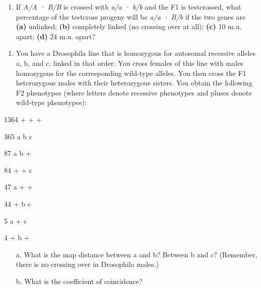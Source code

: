 \documentclass[11pt,]{article}
\providecommand{\tightlist}{%
  \setlength{\itemsep}{0pt}\setlength{\parskip}{0pt}}
\begin{document}
\begin{blackbox}

\begin{enumerate}
\def\labelenumi{\arabic{enumi}.}
\setcounter{enumi}{17}
\tightlist
\item
  If \emph{A/A · B/B} is crossed with \emph{a/a · b/b} and the F1 is
  testcrossed, what percentage of the testcross progeny will be
  \emph{a/a · B/b} if the two genes are \textbf{(a)} unlinked;
  \textbf{(b)} completely linked (no crossing over at all); \textbf{(c)}
  10 m.u. apart; \textbf{(d)} 24 m.u. apart?
\end{enumerate}

\vspace{19cm}

\end{blackbox}

\begin{blackbox}

\begin{enumerate}
\def\labelenumi{\arabic{enumi}.}
\setcounter{enumi}{21}
\tightlist
\item
  You have a Drosophila line that is homozygous for autosomal recessive
  alleles a, b, and c, linked in that order. You cross females of this
  line with males homozygous for the corresponding wild-type alleles.
  You then cross the F1 heterozygous males with their heterozygous
  sisters. You obtain the following F2 phenotypes (where letters denote
  recessive phenotypes and pluses denote wild-type phenotypes):
\end{enumerate}

\begin{center}

1364 + + + 

365 a b c

87 a b +

84 + + c

47 a + +

44 + b c

5 a + c

4 + b +

\end{center}

\begin{enumerate} 
 \item[a.]{ What is the map distance between a and b? Between b and c? (Remember, there is no crossing over in Drosophila males.) } 
 \item[b.]{ What is the coefficient of coincidence? } 
 \end{enumerate}

\vspace{12cm}

\end{blackbox}
\end{document}
